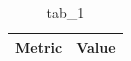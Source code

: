 \begin{table}[htbp]
\centering
\caption{tab_1}
\label{tab:tab_1}
\begin{tabular}{ll}
\toprule
Metric & Value \\
\midrule
\bottomrule
\end{tabular}
\end{table}